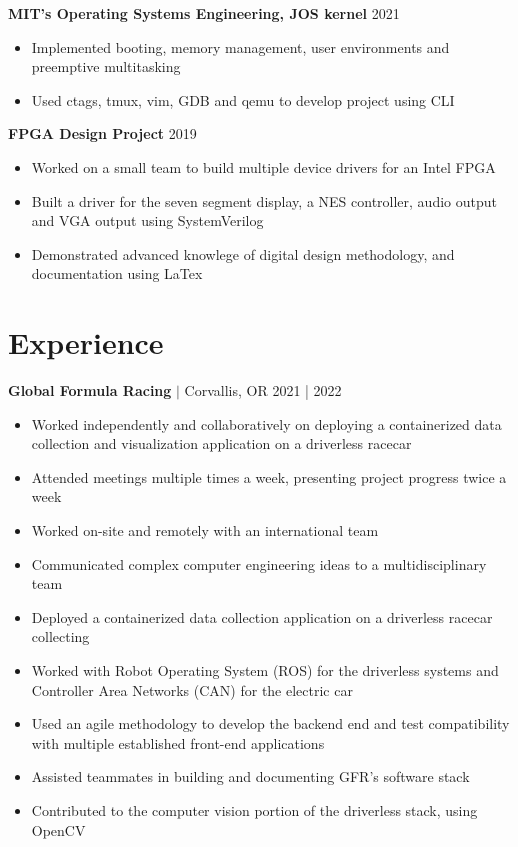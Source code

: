 \documentclass{article}
\begin{document}
	\noindent \textbf{MIT's Operating Systems Engineering, JOS kernel}
	{\hfill 2021}
	\begin{itemize}
		\item Implemented booting, memory management, user environments and preemptive multitasking
		\item Used ctags, tmux, vim, GDB and qemu to develop project using CLI
	\end{itemize}

	\noindent \textbf{FPGA Design Project}
	{\hfill 2019}
	\begin{itemize}
		\item Worked on a small team to build multiple device drivers for an Intel FPGA
		\item Built a driver for the seven segment display, a NES controller, audio output and VGA output using SystemVerilog
		\item Demonstrated advanced knowlege of digital design methodology, and documentation using LaTex
	\end{itemize}


	\section*{Experience}

	\noindent \textbf{Global Formula Racing} $\vert$ Corvallis, OR
	{\hfill 2021 | 2022}
	\begin{itemize}
		\item Worked independently and collaboratively on deploying a containerized data collection and visualization application on a driverless racecar
		\item Attended meetings multiple times a week, presenting project progress twice a week
		\item Worked on-site and remotely with an international team
		\item Communicated complex computer engineering ideas to a multidisciplinary team
		\item Deployed a containerized data collection application on a driverless racecar collecting
		\item Worked with Robot Operating System (ROS) for the driverless systems and Controller Area Networks (CAN) for the electric car
		\item Used an agile methodology to develop the backend end and test compatibility with multiple established front-end applications
		\item Assisted teammates in building and documenting GFR's software stack
		\item Contributed to the computer vision portion of the driverless stack, using OpenCV
	\end{itemize}
\end{document}
